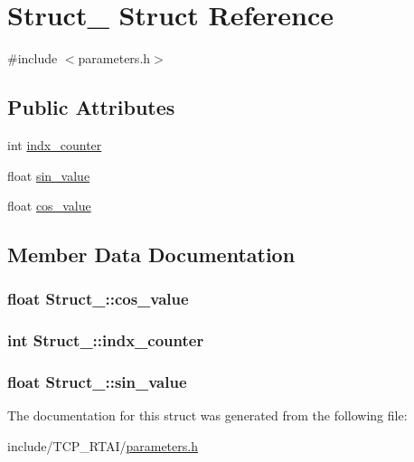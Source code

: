 \hypertarget{structStruct__1}{
\section{Struct\_ Struct Reference}
\label{structStruct__1}
}


{\ttfamily \#include $<$parameters.h$>$}

\subsection*{Public Attributes}
\begin{DoxyCompactItemize}
\item 
int \hyperlink{structStruct__1_a16980746f73afbf2746c684b98720a7b}{indx\_\-counter}
\item 
float \hyperlink{structStruct__1_a9eef1c278a25ab48b2e9e3fa1e2531d2}{sin\_\-value}
\item 
float \hyperlink{structStruct__1_adbd96b24a9a2bb5b36c3dafc0d3343b4}{cos\_\-value}
\end{DoxyCompactItemize}


\subsection{Member Data Documentation}
\hypertarget{structStruct__1_adbd96b24a9a2bb5b36c3dafc0d3343b4}{
\subsubsection[{cos\_\-value}]{\setlength{\rightskip}{0pt plus 5cm}float {\bf Struct\_::cos\_\-value}}}
\label{structStruct__1_adbd96b24a9a2bb5b36c3dafc0d3343b4}
\hypertarget{structStruct__1_a16980746f73afbf2746c684b98720a7b}{
\subsubsection[{indx\_\-counter}]{\setlength{\rightskip}{0pt plus 5cm}int {\bf Struct\_::indx\_\-counter}}}
\label{structStruct__1_a16980746f73afbf2746c684b98720a7b}
\hypertarget{structStruct__1_a9eef1c278a25ab48b2e9e3fa1e2531d2}{
\subsubsection[{sin\_\-value}]{\setlength{\rightskip}{0pt plus 5cm}float {\bf Struct\_::sin\_\-value}}}
\label{structStruct__1_a9eef1c278a25ab48b2e9e3fa1e2531d2}


The documentation for this struct was generated from the following file:\begin{DoxyCompactItemize}
\item 
include/TCP\_\-RTAI/\hyperlink{include_2TCP__RTAI_2parameters_8h}{parameters.h}\end{DoxyCompactItemize}
